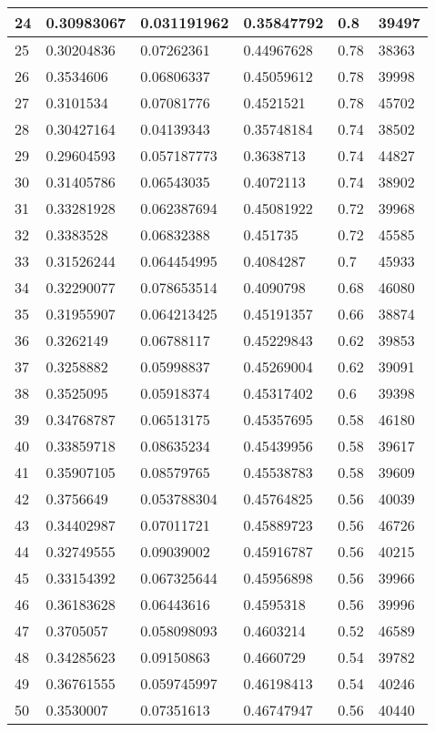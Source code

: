 \begin{longtable}{|l|l|l|l|l|l|}
24 & 0.30983067 & 0.031191962 & 0.35847792 & 0.8 & 39497 \\ \hline 
25 & 0.30204836 & 0.07262361 & 0.44967628 & 0.78 & 38363 \\ \hline 
26 & 0.3534606 & 0.06806337 & 0.45059612 & 0.78 & 39998 \\ \hline 
27 & 0.3101534 & 0.07081776 & 0.4521521 & 0.78 & 45702 \\ \hline 
28 & 0.30427164 & 0.04139343 & 0.35748184 & 0.74 & 38502 \\ \hline 
29 & 0.29604593 & 0.057187773 & 0.3638713 & 0.74 & 44827 \\ \hline 
30 & 0.31405786 & 0.06543035 & 0.4072113 & 0.74 & 38902 \\ \hline 
31 & 0.33281928 & 0.062387694 & 0.45081922 & 0.72 & 39968 \\ \hline 
32 & 0.3383528 & 0.06832388 & 0.451735 & 0.72 & 45585 \\ \hline 
33 & 0.31526244 & 0.064454995 & 0.4084287 & 0.7 & 45933 \\ \hline 
34 & 0.32290077 & 0.078653514 & 0.4090798 & 0.68 & 46080 \\ \hline 
35 & 0.31955907 & 0.064213425 & 0.45191357 & 0.66 & 38874 \\ \hline 
36 & 0.3262149 & 0.06788117 & 0.45229843 & 0.62 & 39853 \\ \hline 
37 & 0.3258882 & 0.05998837 & 0.45269004 & 0.62 & 39091 \\ \hline 
38 & 0.3525095 & 0.05918374 & 0.45317402 & 0.6 & 39398 \\ \hline 
39 & 0.34768787 & 0.06513175 & 0.45357695 & 0.58 & 46180 \\ \hline 
40 & 0.33859718 & 0.08635234 & 0.45439956 & 0.58 & 39617 \\ \hline 
41 & 0.35907105 & 0.08579765 & 0.45538783 & 0.58 & 39609 \\ \hline 
42 & 0.3756649 & 0.053788304 & 0.45764825 & 0.56 & 40039 \\ \hline 
43 & 0.34402987 & 0.07011721 & 0.45889723 & 0.56 & 46726 \\ \hline 
44 & 0.32749555 & 0.09039002 & 0.45916787 & 0.56 & 40215 \\ \hline 
45 & 0.33154392 & 0.067325644 & 0.45956898 & 0.56 & 39966 \\ \hline 
46 & 0.36183628 & 0.06443616 & 0.4595318 & 0.56 & 39996 \\ \hline 
47 & 0.3705057 & 0.058098093 & 0.4603214 & 0.52 & 46589 \\ \hline 
48 & 0.34285623 & 0.09150863 & 0.4660729 & 0.54 & 39782 \\ \hline 
49 & 0.36761555 & 0.059745997 & 0.46198413 & 0.54 & 40246 \\ \hline 
50 & 0.3530007 & 0.07351613 & 0.46747947 & 0.56 & 40440 \\ \hline 
\end{longtable}